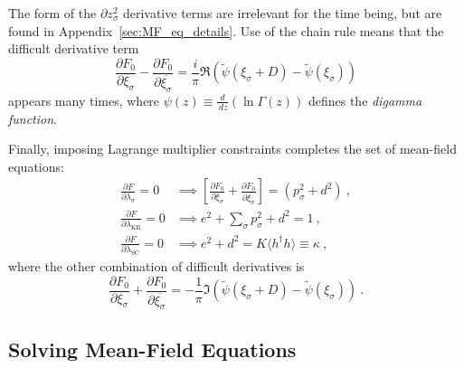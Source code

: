 \documentclass[12pt]{article}
\begin{document}
The form of the $ \partial z^2_{\sigma} $ derivative terms are irrelevant for the time being, but are found in Appendix~\ref{sec:MF_eq_details}. Use of the chain rule means that the difficult derivative term
\begin{equation}
\frac{\partial F_{0}}{\partial \xi_{\sigma}} - \frac{\partial F_{0}}{\partial \overline{\xi_{\sigma}}} = \frac{i}{\pi} \Re{( \widetilde{\psi}(\xi_{\sigma} + D) - \widetilde{\psi}(\xi_{\sigma}))}
\end{equation}
appears many times, where $ \psi(z) \equiv \frac{d}{\,dz}(\ln{\Gamma(z)}) $ defines the \textit{digamma function}.


Finally, imposing Lagrange multiplier constraints completes the set of mean-field equations:
\begin{align}
\frac{\partial F}{\partial \lambda_{\sigma}} = 0 &\implies \left[ \frac{\partial F_{0}}{\partial \xi_{\sigma}} + \frac{\partial F_{0}}{\partial \overline{\xi_{\sigma}}} \right] = (p^2_{\sigma} + d^2) ~ , \label{eq:MF_lambda_sigma} \\
\frac{\partial F}{\partial \lambda_{\text{KR}}} = 0 &\implies e^2 + \sum_{\sigma} p^2_{\sigma} + d^2 = 1 ~ , \label{eq:MF_lambda_KR} \\
\frac{\partial F}{\partial \lambda_{\text{SC}}} = 0 &\implies e^2 + d^2 = K \langle h^{\dagger} h \rangle \equiv \kappa ~ , \label{eq:MF_lambda_SC}
\end{align}
where the other combination of difficult derivatives is
\begin{equation}
\frac{\partial F_{0}}{\partial \xi_{\sigma}} + \frac{\partial F_{0}}{\partial \overline{\xi_{\sigma}}} = - \frac{1}{\pi} \Im{( \widetilde{\psi}(\xi_{\sigma} + D) - \widetilde{\psi}(\xi_{\sigma}))} ~ .
\end{equation}




\subsection{Solving Mean-Field Equations}
\end{document}
